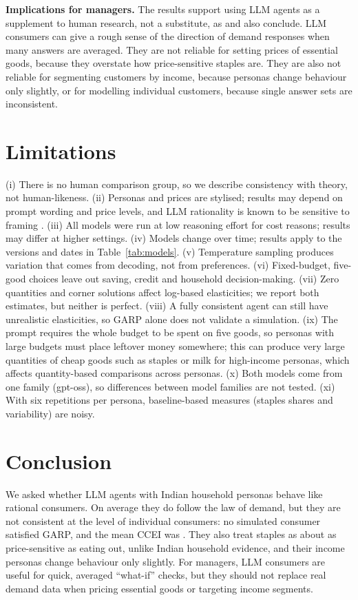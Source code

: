 \textbf{Implications for managers.} The results support using LLM agents as a supplement to human research, not a substitute, as \citet{brand2023} and \citet{hoq2026} also conclude. LLM consumers can give a rough sense of the direction of demand responses when many answers are averaged. They are not reliable for setting prices of essential goods, because they overstate how price-sensitive staples are. They are also not reliable for segmenting customers by income, because personas change behaviour only slightly, or for modelling individual customers, because single answer sets are inconsistent.

\section{Limitations}
(i) There is no human comparison group, so we describe consistency with theory, not human-likeness. (ii) Personas and prices are stylised; results may depend on prompt wording and price levels, and LLM rationality is known to be sensitive to framing \citep{chen2023}. (iii) All models were run at low reasoning effort for cost reasons; results may differ at higher settings. (iv) Models change over time; results apply to the versions and dates in Table~\ref{tab:models}. (v) Temperature sampling produces variation that comes from decoding, not from preferences. (vi) Fixed-budget, five-good choices leave out saving, credit and household decision-making. (vii) Zero quantities and corner solutions affect log-based elasticities; we report both estimates, but neither is perfect. (viii) A fully consistent agent can still have unrealistic elasticities, so GARP alone does not validate a simulation. (ix) The prompt requires the whole budget to be spent on five goods, so personas with large budgets must place leftover money somewhere; this can produce very large quantities of cheap goods such as staples or milk for high-income personas, which affects quantity-based comparisons across personas. (x) Both models come from one family (gpt-oss), so differences between model families are not tested. (xi) With six repetitions per persona, baseline-based measures (staples shares and variability) are noisy.

\section{Conclusion}
We asked whether LLM agents with Indian household personas behave like rational consumers. On average they do follow the law of demand, but they are not consistent at the level of individual consumers: no simulated consumer satisfied GARP, and the mean CCEI was \MeanCCEI{}. They also treat staples as about as price-sensitive as eating out, unlike Indian household evidence, and their income personas change behaviour only slightly. For managers, LLM consumers are useful for quick, averaged ``what-if'' checks, but they should not replace real demand data when pricing essential goods or targeting income segments.

